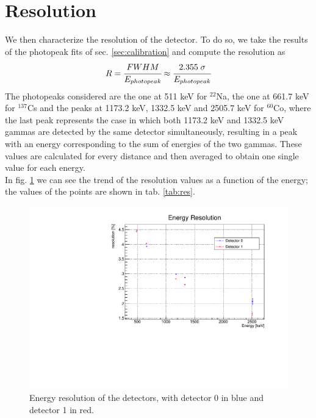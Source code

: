 \section{Resolution}
\label{sec:resolution}

We then characterize the resolution of the detector. To do so, we take the results of the photopeak fits of sec. \ref{sec:calibration} and compute the resolution as
\begin{equation}
    R = \cfrac{FWHM}{E_{photopeak}} \approx \cfrac{2.355 \; \sigma}{E_{photopeak}}
\end{equation}
The photopeaks considered are the one at 511 keV for $^{22}$Na, the one at 661.7 keV for $^{137}$Cs and the peaks at 1173.2 keV, 1332.5 keV and 2505.7 keV for $^{60}$Co, where the last peak represents the case in which both 1173.2 keV and 1332.5 keV gammas are detected by the same detector simultaneously, resulting in a peak with an energy corresponding to the sum of energies of the two gammas. These values are calculated for every distance and then averaged to obtain one single value for each energy. \\
In fig. \ref{fig:res} we can see the trend of the resolution values as a function of the energy; the values of the points are shown in tab. \ref{tab:res}.

\begin{figure}[H]
    \centering
    \includegraphics[scale=0.5]{Images/analysis/resolution/res.pdf}
    \caption{Energy resolution of the detectors, with detector 0 in blue and detector 1 in red.}
    \label{fig:res}
\end{figure}

